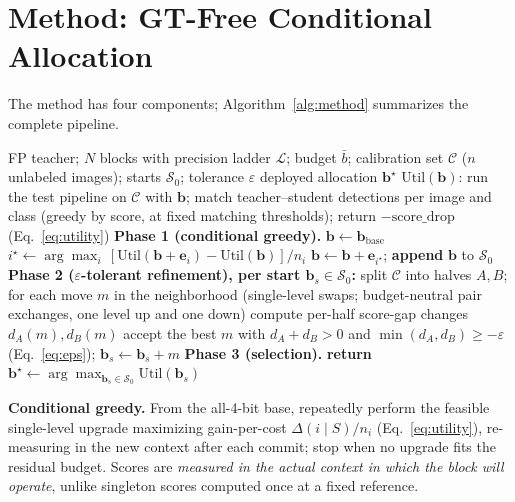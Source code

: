 \section{Method: GT-Free Conditional Allocation}
\label{sec:method}

The method has four components; Algorithm~\ref{alg:method} summarizes
the complete pipeline.

\begin{algorithm}[t]
\caption{GT-free conditional allocation at budget $\bar b$.}
\label{alg:method}
\begin{algorithmic}[1]
\REQUIRE FP teacher; $N$ blocks with precision ladder $\mathcal L$;
budget $\bar b$; calibration set $\mathcal C$ ($n$ unlabeled images);
starts $\mathcal S_0$; tolerance $\varepsilon$
\ENSURE deployed allocation $\mathbf b^{\star}$
\STATE $\mathrm{Util}(\mathbf b)$: run the test pipeline on $\mathcal C$
with $\mathbf b$; match teacher--student detections per image and class
(greedy by score, at fixed matching thresholds); return
$-\mathrm{score\_drop}$ (Eq.~\eqref{eq:utility})
\STATE \textbf{Phase 1 (conditional greedy).} $\mathbf b \leftarrow \mathbf b_{\mathrm{base}}$
\STATE $i^{\star} \leftarrow \arg\max_i\,
[\mathrm{Util}(\mathbf b{+}\mathbf e_i)-\mathrm{Util}(\mathbf b)]/n_i$
\STATE $\mathbf b \leftarrow \mathbf b + \mathbf e_{i^{\star}}$;
\textbf{append} $\mathbf b$ to $\mathcal S_0$
\ENDWHILE
\STATE \textbf{Phase 2 ($\varepsilon$-tolerant refinement), per start $\mathbf b_s \in \mathcal S_0$:}
\REPEAT
\STATE split $\mathcal C$ into halves $A,B$; for each move $m$ in the
neighborhood (single-level swaps; budget-neutral pair exchanges, one level
up and one down) compute per-half score-gap changes $d_A(m),d_B(m)$
\STATE accept the best $m$ with $d_A{+}d_B>0$ and
$\min(d_A,d_B)\geq-\varepsilon$ (Eq.~\eqref{eq:eps});
$\mathbf b_s \leftarrow \mathbf b_s{+}m$
\STATE \textbf{Phase 3 (selection).} \textbf{return}
$\mathbf b^{\star} \leftarrow \arg\max_{\mathbf b_s \in \mathcal S_0}
\mathrm{Util}(\mathbf b_s)$ 
\end{algorithmic}
\end{algorithm}

\smallskip
\noindent\textbf{Conditional greedy.}
From the all-4-bit base, repeatedly perform the feasible single-level
upgrade maximizing gain-per-cost $\Delta(i\mid S)/n_i$
(Eq.~\eqref{eq:utility}), re-measuring in the new context after each
commit; stop when no upgrade fits the residual budget. Scores are
\emph{measured in the actual context in which the block will operate},
unlike singleton scores computed once at a fixed reference.

